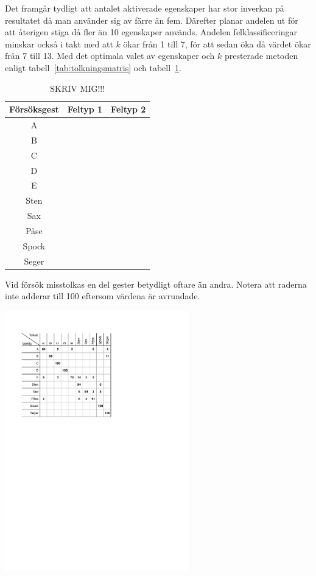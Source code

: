 \documentclass[../rapport_MVEX01-11-05]{subfiles}
\begin{document}
Det framgår tydligt att antalet aktiverade egenskaper har stor
inverkan på resultatet då man använder sig av färre än
fem. Därefter planar andelen ut för att återigen stiga då
fler än 10 egenskaper används. Andelen felklassificeringar
minskar också i takt med att $k$ ökar från 1 till 7, för att sedan
öka då värdet ökar från 7 till 13. Med det optimala
valet av egenskaper och $k$ presterade metoden enligt
tabell~\ref{tab:tolkningsmatris} och tabell~\ref{tab:prestanda}.


\begin{table}[tbp]
	\centering
	\label{tab:prestanda}
	\caption{SKRIV MIG!!!}
	\begin{tabular}{c c c}
		\toprule 
		Försöksgest & Feltyp 1 & Feltyp 2 \\
		\midrule 
		A & & \\
		B & & \\
		C & & \\
		D & & \\
		E & & \\
		Sten & & \\
		Sax & & \\
		Påse & & \\
		Spock & & \\
		Seger & & \\
		\bottomrule 
	\end{tabular}
\end{table}

\begin{table}[tbp]
	  \centering
		\label{tab:tolkningsmatris}
		\caption{Vid försök misstolkas en del gester betydligt oftare än
		andra. Notera att raderna inte adderar till 100 eftersom värdena är
		avrundade.}
    \includegraphics[trim=2cm 16cm 8cm 2.5cm,clip=true,width=8cm]{bilder/tolkningsmatris.pdf}
\end{table}
\end{document}
